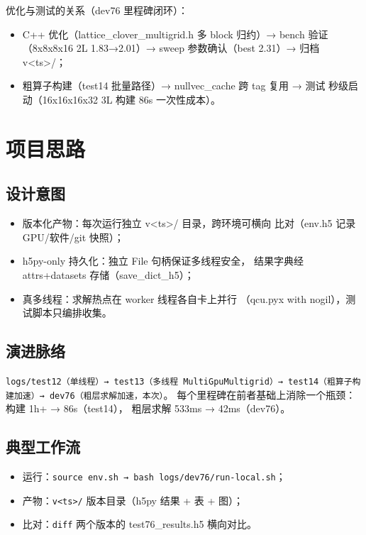 \documentclass[UTF8]{ctexart}
\begin{document}
\textcolor{relation}{优化与测试的关系}（dev76 里程碑闭环）：
\begin{itemize}
\item C++ 优化（lattice\_clover\_multigrid.h 多 block 归约）→ bench 验证
  （8x8x8x16 2L 1.83→2.01）→ sweep 参数确认（best 2.31）→ 归档 v<ts>/；
\item 粗算子构建（test14 批量路径）→ nullvec\_cache 跨 tag 复用 → 测试
  秒级启动（16x16x16x32 3L 构建 86s 一次性成本）。
\end{itemize}

\section{项目思路}
\subsection{设计意图}
\begin{itemize}
\item \textcolor{idea}{版本化产物}：每次运行独立 v<ts>/ 目录，跨环境可横向
  比对（env.h5 记录 GPU/软件/git 快照）；
\item \textcolor{idea}{h5py-only 持久化}：独立 File 句柄保证多线程安全，
  结果字典经 attrs+datasets 存储（save\_dict\_h5）；
\item \textcolor{idea}{真多线程}：求解热点在 worker 线程各自卡上并行
  （qcu.pyx with nogil），测试脚本只编排收集。
\end{itemize}
\subsection{演进脉络}
\texttt{logs/test12（单线程）→ test13（多线程 MultiGpuMultigrid）→
test14（粗算子构建加速）→ dev76（粗层求解加速，本次）}。
每个里程碑在前者基础上消除一个瓶颈：构建 1h+ → 86s（test14），
粗层求解 533ms → 42ms（dev76）。
\subsection{典型工作流}
\begin{itemize}
\item 运行：\texttt{source env.sh → bash logs/dev76/run-local.sh}；
\item 产物：\texttt{v<ts>/} 版本目录（h5py 结果 + 表 + 图）；
\item 比对：\texttt{diff} 两个版本的 test76\_results.h5 横向对比。
\end{itemize}
\end{document}
